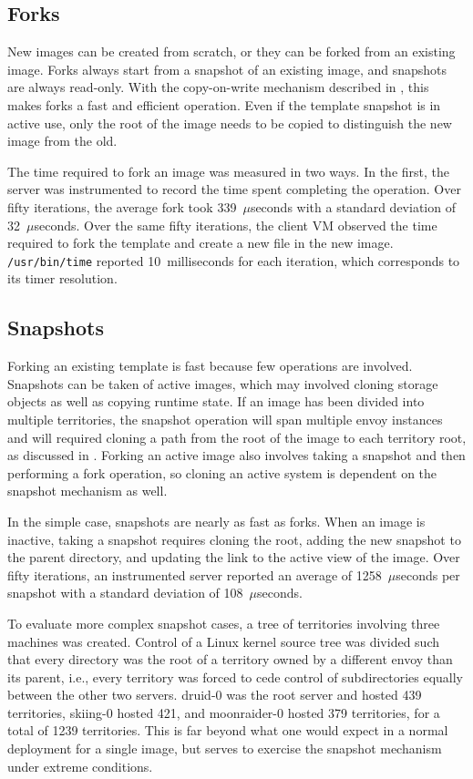 \subsection{Forks}

New images can be created from scratch, or they can be forked from an existing image. Forks always start from a snapshot of an existing image, and snapshots are always read-only. With the copy-on-write mechanism described in , this makes forks a fast and efficient operation. Even if the template snapshot is in active use, only the root of the image needs to be copied to distinguish the new image from the old.

The time required to fork an image was measured in two ways. In the first, the server was instrumented to record the time spent completing the operation. Over fifty iterations, the average fork took 339~$\mu$seconds with a standard deviation of 32~$\mu$seconds. Over the same fifty iterations, the client VM observed the time required to fork the template and create a new file in the new image. \texttt{/usr/bin/time} reported 10~milliseconds for each iteration, which corresponds to its timer resolution.

\subsection{Snapshots}

Forking an existing template is fast because few operations are involved. Snapshots can be taken of active images, which may involved cloning storage objects as well as copying runtime state. If an image has been divided into multiple territories, the snapshot operation will span multiple envoy instances and will required cloning a path from the root of the image to each territory root, as discussed in . Forking an active image also involves taking a snapshot and then performing a fork operation, so cloning an active system is dependent on the snapshot mechanism as well.

In the simple case, snapshots are nearly as fast as forks. When an image is inactive, taking a snapshot requires cloning the root, adding the new snapshot to the parent directory, and updating the link to the active view of the image. Over fifty iterations, an instrumented server reported an average of 1258~$\mu$seconds per snapshot with a standard deviation of 108~$\mu$seconds.

To evaluate more complex snapshot cases, a tree of territories involving three machines was created. Control of a Linux kernel source tree was divided such that every directory was the root of a territory owned by a different envoy than its parent, i.e., every territory was forced to cede control of subdirectories equally between the other two servers. druid-0 was the root server and hosted 439 territories, skiing-0 hosted 421, and moonraider-0 hosted 379 territories, for a total of 1239 territories. This is far beyond what one would expect in a normal deployment for a single image, but serves to exercise the snapshot mechanism under extreme conditions.

